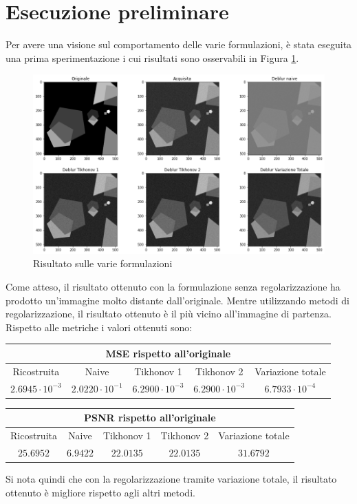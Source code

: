 \documentclass[11pt]{article}
\begin{document}
\section*{Esecuzione preliminare}
Per avere una visione sul comportamento delle varie formulazioni, è stata eseguita una prima sperimentazione i cui risultati sono osservabili in Figura \ref{fig:deblur1}.\\
\begin{figure}[H]
    \centering
    \includegraphics[width=15cm]{deblur1.png}
    \caption{Risultato sulle varie formulazioni}
    \label{fig:deblur1}
\end{figure}
Come atteso, il risultato ottenuto con la formulazione senza regolarizzazione ha prodotto un'immagine molto distante dall'originale. 
Mentre utilizzando metodi di regolarizzazione, il risultato ottenuto è il più vicino all'immagine di partenza. Rispetto alle metriche i valori ottenuti sono:
\begin{center}
    \begin{tabular}{ |c|c|c|c|c| }
    \hline
    \multicolumn{5}{|c|}{MSE rispetto all'originale} \\
    \hline
    Ricostruita & Naive & Tikhonov 1 & Tikhonov 2 & Variazione totale \\ 
    $2.6945 \cdot 10^{-3}$ & $2.0220 \cdot 10^{-1}$ & $6.2900 \cdot 10^{-3}$ & $6.2900 \cdot 10^{-3}$ & $6.7933 \cdot 10^{-4}$ \\ 
    \hline
    \end{tabular}
\end{center}
\begin{center}
    \begin{tabular}{ |c|c|c|c|c| }
    \hline
    \multicolumn{5}{|c|}{PSNR rispetto all'originale} \\
    \hline
    Ricostruita & Naive & Tikhonov 1 & Tikhonov 2 & Variazione totale \\ 
    $25.6952$ & $6.9422$ & $22.0135$ & $22.0135$ & $31.6792$ \\ 
    \hline
    \end{tabular}
\end{center}
Si nota quindi che con la regolarizzazione tramite variazione totale, il risultato ottenuto è migliore rispetto agli altri metodi.
\end{document}
